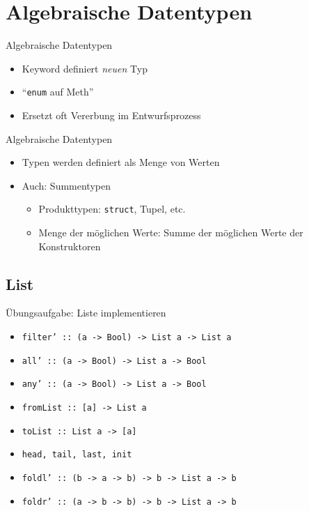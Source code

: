 \documentclass{beamer}
\newcommand{\code}[1]{
	\begin{mdframed}
		
	\end{mdframed}
}
\begin{document}
\section{Algebraische Datentypen}

\begin{frame}{Algebraische Datentypen}
	\code{demos/DataExamples.hs}

	\begin{itemize}
		\item Keyword  definiert \emph{neuen} Typ
		\item \enquote{\texttt{enum} auf Meth}
		\item Ersetzt oft Vererbung im Entwurfsprozess
	\end{itemize}
\end{frame}

\begin{frame}{Algebraische Datentypen}
	\code{demos/DataExamples2.hs}
	
	\begin{itemize}
		\item Typen werden definiert als Menge von Werten
		\item Auch: Summentypen
		\begin{itemize}
			\item Produkttypen: \texttt{struct}, Tupel, etc.
			\item Menge der möglichen Werte: Summe der möglichen Werte der Konstruktoren
		\end{itemize}
	\end{itemize}
\end{frame}

\subsection{List}

\begin{frame}{Übungsaufgabe: Liste implementieren}
	\code{demos/List.hs}

	\begin{itemize}
		\item \texttt{filter' :: (a -> Bool) -> List a -> List a}
		\item \texttt{all' :: (a -> Bool) -> List a -> Bool}
		\item \texttt{any' :: (a -> Bool) -> List a -> Bool}
		\pause
		\item \texttt{fromList :: [a] -> List a}
		\item \texttt{toList :: List a -> [a]}
		\item \texttt{head, tail, last, init}
		\pause
		\item \texttt{foldl' :: (b -> a -> b) -> b -> List a -> b}
		\item \texttt{foldr' :: (a -> b -> b) -> b -> List a -> b}
	\end{itemize}
\end{frame}
\end{document}
